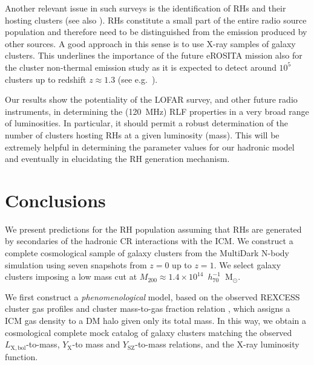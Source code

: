 \documentclass[traditabstract]{aa}
\newcommand{\rmn}{\mathrm}
\begin{document}
Another relevant issue in such surveys is the identification of RHs and their hosting clusters (see also \citealp{2010A&A...509A..68C}). RHs constitute a small part of the entire radio source population and therefore need to be distinguished from the emission produced by other sources. A good approach in this sense is to use X-ray samples of galaxy clusters. This underlines the importance of the future eROSITA mission also for the cluster non-thermal emission study as it is expected to detect around $10^{5}$ clusters up to redshift $z \approx 1.3$ (see e.g.~\citealp{2011MSAIS..17..159C}).

Our results show the potentiality of the LOFAR survey, and other future radio instruments, in determining the (120~MHz) RLF properties in a very broad range of luminosities. In particular, it should permit a robust determination of the number of clusters hosting RHs at a given luminosity (mass). This will be extremely helpful in determining the parameter values for our hadronic model and eventually in elucidating the RH generation mechanism.


\section{Conclusions}
\label{sec:6}
We present predictions for the RH population assuming that RHs are generated by secondaries of the hadronic CR interactions with the ICM. We construct a complete cosmological sample of galaxy clusters from the MultiDark N-body simulation \citep{2011arXiv1104.5130P} using seven snapshots from $z = 0$ up to $z = 1$. We select galaxy clusters imposing a low mass cut at $M_{200}\approx1.4\times10^{14}$~$h_{70}^{-1}$~M$_{\odot}$. 

We first construct a \emph{phenomenological} model, based on the observed REXCESS cluster gas profiles \citep{2008A&A...487..431C} and cluster mass-to-gas fraction relation \citep{2009ApJ...693.1142S}, which assigns a ICM gas density to a DM halo given only its total mass. In this way, we obtain a cosmological complete mock catalog of galaxy clusters matching the observed $L_{\rmn{X, bol}}$-to-mass, $Y_{\rmn{X}}$-to mass and $Y_{\rmn{SZ}}$-to-mass relations, and the X-ray luminosity function.
\end{document}
